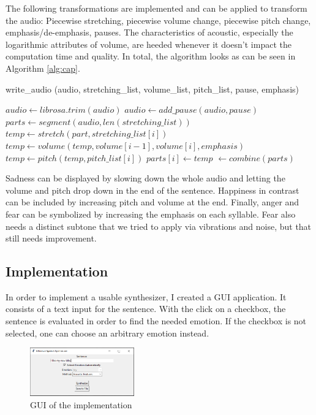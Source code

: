 \documentclass[11pt]{article}
\begin{document}
The following transformations are implemented and can be applied to transform the audio:
Piecewise stretching, piecewise volume change, piecewise pitch change, emphasis/de-emphasis, pauses. The characteristics of acoustic, especially the logarithmic attributes of volume, are heeded whenever it doesn't impact the computation time and quality.
In total, the algorithm looks as can be seen in Algorithm \ref{alg:cap}.


\begin{algorithm}
\caption{write\_audio (audio, stretching\_list, volume\_list, pitch\_list, pause, emphasis)}\label{alg:cap}
\begin{algorithmic}
\State $audio \gets librosa.trim(audio)$
	\State $audio  \gets  add\_pause(audio,pause)$
\EndIf
\State $parts \gets segment(audio,len(stretching\_list))$
\State $temp  \gets  stretch(part, stretching\_list[i])$ 
\State $temp \gets volume (temp, volume[i-1], volume[i], emphasis)$
\State $temp \gets pitch (temp, pitch\_list[i])$
\State $parts[i] \gets temp$
\EndFor
\State $\gets combine(parts)$
\end{algorithmic}
\end{algorithm}


Sadness can be displayed by slowing down the whole audio and letting the volume and pitch drop down in the end of the sentence. Happiness in contrast can be included by increasing pitch and volume at the end. Finally, anger and fear can be symbolized by increasing the emphasis on each syllable. Fear also needs a distinct subtone that we tried to apply via vibrations and noise, but that still needs improvement.


\subsection{Implementation}

In order to implement a usable synthesizer, I created a GUI application. It consists of a text input for the sentence. With the click on a checkbox, the sentence is evaluated in order to find the needed emotion. If the checkbox is not selected, one can choose an arbitrary emotion instead. 

\begin{figure}[h]
 \centering
\includegraphics[width=0.4\textwidth]{"Bilder/gui_v2.png"}
\caption{GUI of the implementation}
\end{figure}
\end{document}
